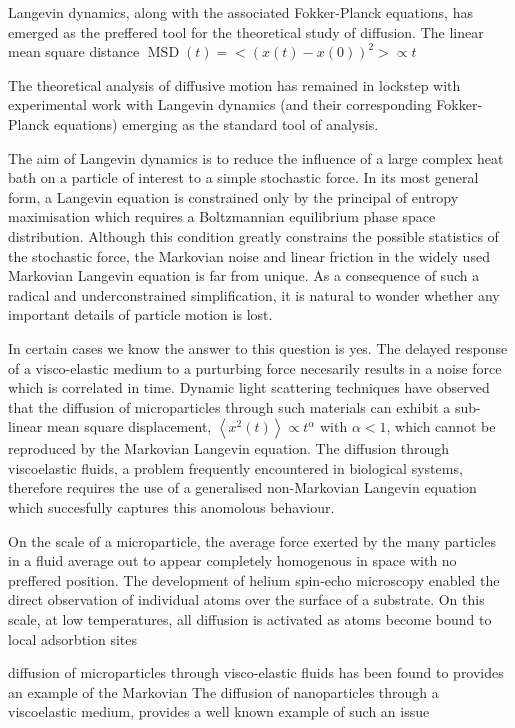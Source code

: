 \documentclass[7pt]{article}
\begin{document}
Langevin dynamics, along with the associated Fokker-Planck equations, has emerged as the preffered tool for the theoretical study of diffusion. The linear mean square distance $\operatorname{MSD}(t)=<(x(t)-x(0))^2> \propto t$  

The theoretical analysis of diffusive motion has remained in lockstep with experimental work with Langevin dynamics (and their corresponding Fokker-Planck equations) emerging as the standard tool of analysis.

The aim of Langevin dynamics is to reduce the influence of a large complex heat bath on a particle of interest to a simple stochastic force. In its most general form, a Langevin equation is constrained only by the principal of entropy maximisation which requires a Boltzmannian equilibrium phase space distribution. Although this condition greatly constrains the possible statistics of the stochastic force, the Markovian noise and linear friction in the widely used Markovian Langevin equation is far from unique. As a consequence of such a radical and underconstrained simplification, it is natural to wonder whether any important details of particle motion is lost.

In certain cases we know the answer to this question is yes. The delayed response of a visco-elastic medium to a purturbing force necesarily results in a noise force which is correlated in time. Dynamic light scattering techniques have observed that the diffusion of microparticles through such materials can exhibit a sub-linear mean square displacement, $\left<x^2(t)\right> \propto t^\alpha$ with $\alpha < 1$, which cannot be reproduced by the Markovian Langevin equation. The diffusion through viscoelastic fluids, a problem frequently encountered in biological systems, therefore requires the use of a generalised non-Markovian Langevin equation which succesfully captures this anomolous behaviour.

On the scale of a microparticle, the average force exerted by the many particles in a fluid average out to appear completely homogenous in space with no preffered position. The development of helium spin-echo microscopy enabled the direct observation of individual atoms over the surface of a substrate. On this scale, at low temperatures, all diffusion is activated as atoms become bound to local adsorbtion sites  

diffusion of microparticles through visco-elastic fluids has been found to provides an example of the Markovian The diffusion of nanoparticles through a viscoelastic medium, provides a well known example of such an issue 
\end{document}

